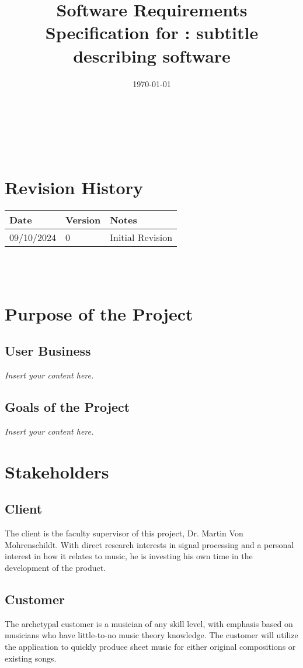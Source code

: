\documentclass[12pt]{article}
\newcommand{\lips}{\textit{Insert your content here.}}
\begin{document}
\title{Software Requirements Specification for \progname: subtitle describing software} 
\author{\authname}
\date{\today}
	
\maketitle

~\newpage


\tableofcontents

~\newpage

\section*{Revision History}

\begin{tabularx}{\textwidth}{p{3cm}p{2cm}X}
\toprule {\textbf{Date}} & {\textbf{Version}} & {\textbf{Notes}}\\
\midrule
09/10/2024 & 0 & Initial Revision\\
\bottomrule
\end{tabularx}

~\\

~\newpage
\section{Purpose of the Project}
\subsection{User Business}
\lips
\subsection{Goals of the Project}
\lips
\section{Stakeholders}
\subsection{Client}
The client is the faculty supervisor of this project, Dr. Martin Von Mohrenschildt. With direct research interests in signal processing and a personal interest in how it relates to 
music, he is investing his own time in the development of the product.
\subsection{Customer}
The archetypal customer is a musician of any skill level, with emphasis based on musicians who have little-to-no music theory knowledge. The customer will utilize the application 
to quickly produce sheet music for either original compositions or existing songs. 
\end{document}
